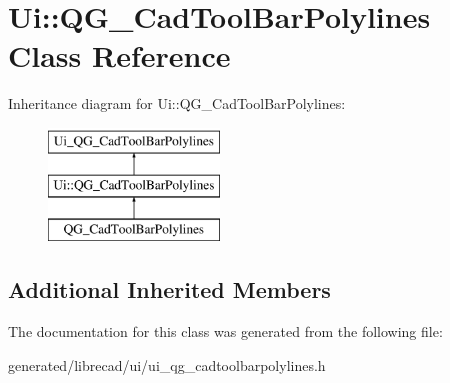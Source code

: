\hypertarget{classUi_1_1QG__CadToolBarPolylines}{\section{Ui\-:\-:Q\-G\-\_\-\-Cad\-Tool\-Bar\-Polylines Class Reference}
\label{classUi_1_1QG__CadToolBarPolylines}
}
Inheritance diagram for Ui\-:\-:Q\-G\-\_\-\-Cad\-Tool\-Bar\-Polylines\-:\begin{figure}[H]
\begin{center}
\leavevmode
\includegraphics[height=3.000000cm]{classUi_1_1QG__CadToolBarPolylines}
\end{center}
\end{figure}
\subsection*{Additional Inherited Members}


The documentation for this class was generated from the following file\-:\begin{DoxyCompactItemize}
\item 
generated/librecad/ui/ui\-\_\-qg\-\_\-cadtoolbarpolylines.\-h\end{DoxyCompactItemize}
